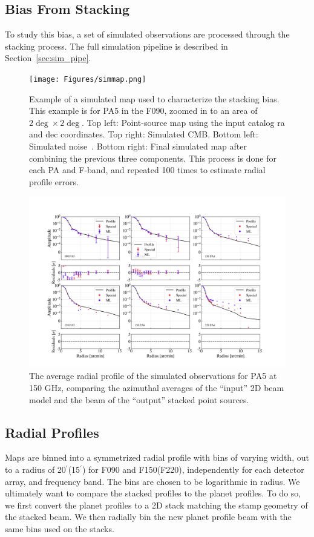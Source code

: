 \subsection{Bias From Stacking}
\label{subsec:bias}
To study this bias, a set of simulated observations are processed through the stacking process.  The full simulation pipeline is described in Section~\ref{sec:sim_pipe}.
\begin{figure}[ht!]
    \centering
    \texttt{[image: Figures/simmap.png]}
    \caption{Example of a simulated map used to characterize the stacking bias.  This example is for PA5 in the F090, zoomed in to an area of $2\deg\times2\deg$.  Top left: Point-source map using the input catalog ra and dec coordinates.  Top right:  Simulated CMB.  Bottom left:  Simulated noise~\cite{atkins}.  Bottom right: Final simulated map after combining the previous three components.  This process is done for each PA and F-band, and repeated 100 times to estimate radial profile errors.
    }
    \label{fig:sim_map}
\end{figure}
\begin{figure}
    \centering
    \includegraphics[width=\textwidth]{Figures/profiles_noP_15.png}
    \caption{The average radial profile of the simulated observations for PA5 at 150 GHz, comparing the azimuthal averages of the \enquote{input} 2D beam model and the beam of the \enquote{output} stacked point sources. 
    }
    \label{fig:profiles}
\end{figure}

\subsection{Radial Profiles}
\label{subsec:profs}
Maps are binned into a symmetrized radial profile with bins of varying width, out to a radius of 20$^{\prime}$(15$^{\prime}$) for F090 and F150(F220), independently for each detector array, and frequency band.  The bins are chosen to be logarithmic in radius.  We ultimately want to compare the stacked profiles to the planet profiles.  To do so, we first convert the planet profiles to a 2D stack matching the stamp geometry of the stacked beam.  We then radially bin the new planet profile beam with the same bins used on the stacks.

